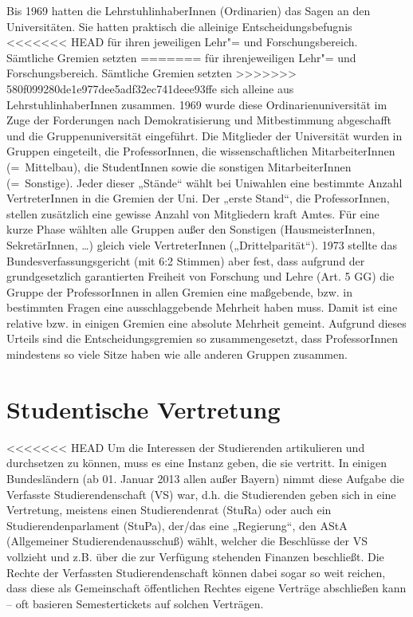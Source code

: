 Bis 1969 hatten die LehrstuhlinhaberInnen (Ordinarien) das Sagen an den
Universitäten. Sie hatten praktisch die alleinige Entscheidungsbefugnis
<<<<<<< HEAD
für ihren jeweiligen Lehr"= und Forschungsbereich. Sämtliche Gremien setzten
=======
für ihrenjeweiligen Lehr"= und Forschungsbereich. Sämtliche Gremien setzten
>>>>>>> 580f099280de1e977dee5adf32ec741deee93ffe
sich alleine aus LehrstuhlinhaberInnen zusammen. 1969 wurde diese
Ordinarienuniversität im Zuge der Forderungen nach Demokratisierung und
Mitbestimmung abgeschafft und die Gruppenuniversität eingeführt. Die
Mitglieder der Universität wurden in Gruppen eingeteilt, die
ProfessorInnen, die wissenschaftlichen MitarbeiterInnen (=\ Mittelbau), die
StudentInnen sowie die sonstigen MitarbeiterInnen (=\ Sonstige). Jeder
dieser „Stände“ wählt bei Uniwahlen eine bestimmte Anzahl VertreterInnen
in die Gremien der Uni. Der „erste Stand“, die ProfessorInnen, stellen
zusätzlich eine gewisse Anzahl von Mitgliedern kraft Amtes. Für eine kurze
Phase wählten alle Gruppen außer den Sonstigen (HausmeisterInnen,
SekretärInnen, \dots) gleich viele VertreterInnen („Drittelparität“).
1973 stellte das Bundesverfassungsgericht (mit 6:2 Stimmen) aber fest, dass
aufgrund der grundgesetzlich garantierten Freiheit von Forschung und Lehre
(Art. 5 GG) die Gruppe der ProfessorInnen in allen Gremien eine
maßgebende, bzw. in bestimmten Fragen eine ausschlaggebende Mehrheit haben
muss. Damit ist eine relative bzw. in einigen Gremien eine absolute
Mehrheit gemeint. Aufgrund dieses Urteils sind die Entscheidungsgremien so
zusammengesetzt, dass ProfessorInnen mindestens so viele Sitze haben wie
alle anderen Gruppen zusammen.



\section{Studentische Vertretung}
<<<<<<< HEAD
Um die Interessen der Studierenden artikulieren und durchsetzen zu können, muss
es eine Instanz geben, die sie vertritt. In einigen Bundesländern (ab 01.
Januar 2013 allen außer Bayern) nimmt diese Aufgabe die Verfasste
Studierendenschaft (VS) war, d.h. die Studierenden geben sich in eine
Vertretung, meistens einen Studierendenrat (StuRa) oder auch ein
Studierendenparlament (StuPa), der/das eine „Regierung“, den AStA (Allgemeiner
Studierendenausschuß) wählt, welcher die Beschlüsse der VS vollzieht und z.B.
über die zur Verfügung stehenden Finanzen beschließt.  Die Rechte der
Verfassten Studierendenschaft können dabei sogar so weit reichen, dass diese
als Gemeinschaft öffentlichen Rechtes eigene Verträge abschließen kann -- oft
basieren Semestertickets auf solchen Verträgen.


